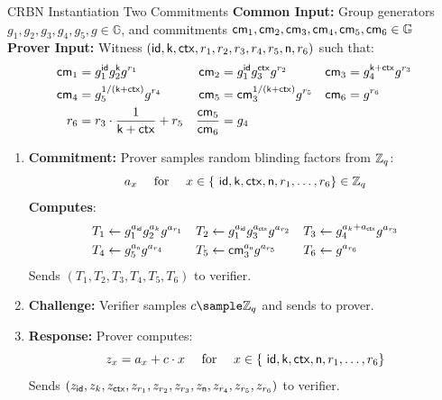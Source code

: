 \begin{protocol}{CRBN Instantiation Two Commitments}{}\label{crbn-instantiation}
\textbf{Common Input:} Group generators $g_1, g_2, g_3, g_4, g_5, g \in \mathbb{G}$, and commitments $\mathsf{cm}_1, \mathsf{cm}_2, \mathsf{cm}_3, \mathsf{cm}_4, \mathsf{cm}_5, \mathsf{cm}_6 \in \mathbb{G}$\\
\textbf{Prover Input:} Witness $(\mathsf{id}, \mathsf{k}, \mathsf{ctx}, r_1, r_2, r_3, r_4, r_5, \textsf{n}, r_6)$ such that:
    \begin{align*}
        \mathsf{cm}_1 &= g_1^{\mathsf{id}} g_2^{\mathsf{k}} g^{r_1}     &    \mathsf{cm}_2 &= g_1^{\mathsf{id}} g_3^{\mathsf{ctx}} g^{r_2}  &   \mathsf{cm}_3 &= g_4^{\mathsf{k} + \mathsf{ctx}} g^{r_3}\\
        \mathsf{cm}_4 &= g_5^{1/(\mathsf{k} + \mathsf{ctx})} g^{r_4}   &   \mathsf{cm}_5 &= \mathsf{cm}_3^{1/(\mathsf{k} + \mathsf{ctx})} g^{r_5}     &   \mathsf{cm}_6 &= g^{r_6} \\
       r_6 &= r_3 \cdot \frac{1}{\mathsf{k} + \mathsf{ctx}} + r_5    &   \frac{\mathsf{cm}_5}{\mathsf{cm}_6} &= g_4
    \end{align*}

\begin{enumerate}
    \item \textbf{Commitment:} Prover samples random blinding factors from $\mathbb{Z}_q$:
    \[
        a_x \quad \text{ for } \quad x \in \{\ \mathsf{id}, \mathsf{k}, \mathsf{ctx}, \textsf{n}, r_1, \ldots,r_6\} \in \mathbb{Z}_q
    \]
    \textbf{Computes}:
    \begin{align*}
        T_1 &\gets g_1^{a_{\mathsf{id}}} g_2^{a_k} g^{a_{r_1}}  &   T_2 &\gets g_1^{a_{\mathsf{id}}} g_3^{a_{\mathsf{ctx}}} g^{a_{r_2}}     &   T_3 &\gets g_4^{a_k + a_{\mathsf{ctx}}} g^{a_{r_3}} \\
        T_4 &\gets g_5^{a_{\textsf{n}}} g^{a_{r_4}}   &   T_5 &\gets \mathsf{cm}_3^{a_{\textsf{n}}} g^{a_{r_5}}     &   T_6 &\gets g^{a_{r_6}}
    \end{align*}
    Sends $(T_1, T_2, T_3, T_4, T_5, T_6)$ to verifier.
    
    \item \textbf{Challenge:} Verifier samples $c \sample \mathbb{Z}_q$ and sends to prover.
    
    \item \textbf{Response:} Prover computes:
    \[
    z_x = a_x + c \cdot x \quad \text{ for } \quad x \in \{\ \mathsf{id}, \mathsf{k}, \mathsf{ctx}, \textsf{n}, r_1, \ldots,r_6\} 
    \]
    Sends $(z_{\mathsf{id}}, z_k, z_{\mathsf{ctx}}, z_{r_1}, z_{r_2}, z_{r_3}, z_{\textsf{n}}, z_{r_4}, z_{r_5}, z_{r_6})$ to verifier.
    

\end{enumerate}
\end{protocol}
